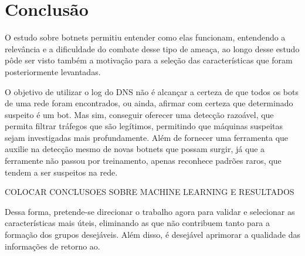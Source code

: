 \chapter{Conclusão}
O estudo sobre botnets permitiu entender como elas funcionam, entendendo a relevância e a dificuldade do combate desse tipo de ameaça, ao longo desse estudo pôde ser visto também a motivação para a seleção das características que foram posteriormente levantadas.

O objetivo de utilizar o log do DNS não é alcançar a certeza de que todos os bots de uma rede foram encontrados, ou ainda, afirmar com certeza que determinado suspeito é um bot. Mas sim, conseguir oferecer uma detecção razoável, que permita filtrar tráfegos que são legítimos, permitindo que máquinas suspeitas sejam investigadas mais profundamente. Além de fornecer uma ferramenta que auxilie na detecção mesmo de novas botnets que possam surgir, já que a ferramente não passou por treinamento, apenas reconhece padrões raros, que tendem a ser suspeitos na rede.

COLOCAR CONCLUSOES SOBRE MACHINE LEARNING E RESULTADOS

Dessa forma, pretende-se direcionar o trabalho agora para validar e selecionar as características mais úteis, eliminando as que não contribuem tanto para a formação dos grupos desejáveis. Além disso, é desejável aprimorar a qualidade das informações de retorno ao. 
